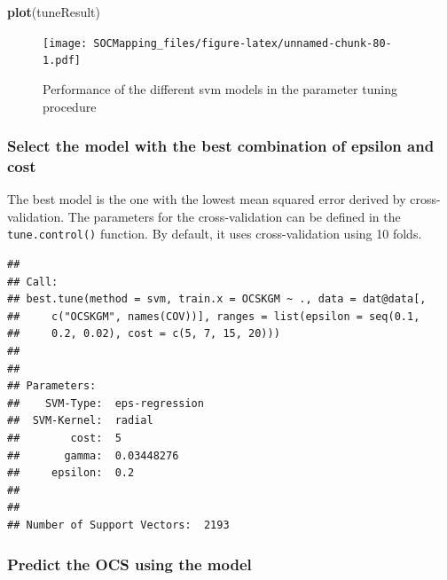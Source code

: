 \documentclass[10pt,b5paper,]{book}
\newenvironment{Shaded}{\begin{snugshade}}{\end{snugshade}}
\newcommand{\CommentTok}[1]{\textcolor[rgb]{0.56,0.35,0.01}{\textit{#1}}}
\newcommand{\KeywordTok}[1]{\textcolor[rgb]{0.13,0.29,0.53}{\textbf{#1}}}
\newcommand{\NormalTok}[1]{#1}
\newcommand{\OperatorTok}[1]{\textcolor[rgb]{0.81,0.36,0.00}{\textbf{#1}}}
\newcommand{\StringTok}[1]{\textcolor[rgb]{0.31,0.60,0.02}{#1}}
\theoremstyle{definition}
\theoremstyle{definition}
\theoremstyle{definition}
\theoremstyle{remark}
\begin{document}
\begin{Shaded}
\begin{Highlighting}[]
\KeywordTok{plot}\NormalTok{(tuneResult)}
\end{Highlighting}
\end{Shaded}

\begin{figure}
\centering
\texttt{[image: SOCMapping\_files/figure-latex/unnamed-chunk-80-1.pdf]}
\caption{\label{fig:unnamed-chunk-80}Performance of the different svm models
in the parameter tuning procedure}
\end{figure}

\hypertarget{select-the-model-with-the-best-combination-of-epsilon-and-cost}{%
\subsubsection{Select the model with the best combination of epsilon and
cost}\label{select-the-model-with-the-best-combination-of-epsilon-and-cost}}

The best model is the one with the lowest mean squared error derived by
cross-validation. The parameters for the cross-validation can be defined
in the \texttt{tune.control()} function. By default, it uses
cross-validation using 10 folds.

\begin{Shaded}
\end{Shaded}

\begin{verbatim}
## 
## Call:
## best.tune(method = svm, train.x = OCSKGM ~ ., data = dat@data[, 
##     c("OCSKGM", names(COV))], ranges = list(epsilon = seq(0.1, 
##     0.2, 0.02), cost = c(5, 7, 15, 20)))
## 
## 
## Parameters:
##    SVM-Type:  eps-regression 
##  SVM-Kernel:  radial 
##        cost:  5 
##       gamma:  0.03448276 
##     epsilon:  0.2 
## 
## 
## Number of Support Vectors:  2193
\end{verbatim}

\hypertarget{predict-the-ocs-using-the-model}{%
\subsubsection{Predict the OCS using the
model}\label{predict-the-ocs-using-the-model}}
\end{document}
